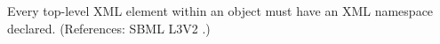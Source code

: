 Every top-level XML element within an \Annotation object must have an XML
namespace declared.  (References: SBML L3V2 .)
